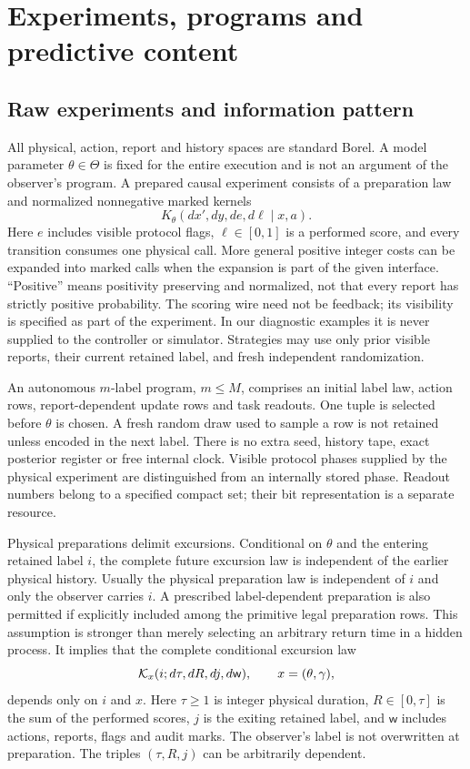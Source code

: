 \section{Experiments, programs and predictive content}
\subsection{Raw experiments and information pattern}
All physical, action, report and history spaces are standard Borel. A model parameter $\theta\in\Theta$ is fixed for the entire execution and is not an argument of the observer's program. A prepared causal experiment consists of a preparation law and normalized nonnegative marked kernels
\[
 K_\theta(dx',dy,de,d\ell\mid x,a).
\]
Here $e$ includes visible protocol flags, $\ell\in[0,1]$ is a performed score, and every transition consumes one physical call. More general positive integer costs can be expanded into marked calls when the expansion is part of the given interface. ``Positive'' means positivity preserving and normalized, not that every report has strictly positive probability. The scoring wire need not be feedback; its visibility is specified as part of the experiment. In our diagnostic examples it is never supplied to the controller or simulator. Strategies may use only prior visible reports, their current retained label, and fresh independent randomization.

An autonomous $m$-label program, $m\le M$, comprises an initial label law, action rows, report-dependent update rows and task readouts. One tuple is selected before $\theta$ is chosen. A fresh random draw used to sample a row is not retained unless encoded in the next label. There is no extra seed, history tape, exact posterior register or free internal clock. Visible protocol phases supplied by the physical experiment are distinguished from an internally stored phase. Readout numbers belong to a specified compact set; their bit representation is a separate resource.

Physical preparations delimit excursions. Conditional on $\theta$ and the entering retained label $i$, the complete future excursion law is independent of the earlier physical history. Usually the physical preparation law is independent of $i$ and only the observer carries $i$. A prescribed label-dependent preparation is also permitted if explicitly included among the primitive legal preparation rows. This assumption is stronger than merely selecting an arbitrary return time in a hidden process. It implies that the complete conditional excursion law
\[
 \mathcal K_x(i;d\tau,dR,dj,d\mathsf w),\qquad x=(\theta,\gamma),
\]
depends only on $i$ and $x$. Here $\tau\ge1$ is integer physical duration, $R\in[0,\tau]$ is the sum of the performed scores, $j$ is the exiting retained label, and $\mathsf w$ includes actions, reports, flags and audit marks. The observer's label is not overwritten at preparation. The triples $(\tau,R,j)$ can be arbitrarily dependent.

